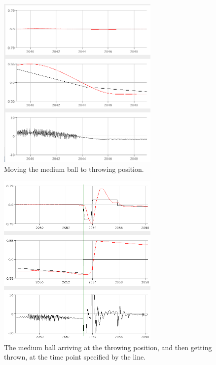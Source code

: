 \begin{figure}[h]
\centering
\includegraphics[width=0.7\textwidth]{figures/movemediumball-crop.png}
\caption{Moving the medium ball to throwing position.}
\label{fig:movemediumball}
\end{figure}

\begin{figure}[h]
\centering
\includegraphics[width=0.7\textwidth]{figures/throwmediumball-crop.png}
\caption{The medium ball arriving at the throwing position, and then getting thrown, at the time point specified by the line.}
\label{fig:throwmediumball}
\end{figure}

